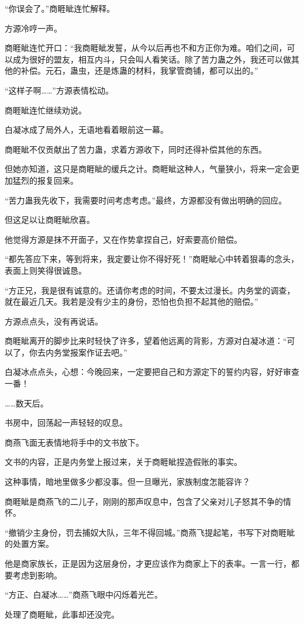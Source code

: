 \begin{this_body}
“你误会了。”商睚眦连忙解释。

方源冷哼一声。

商睚眦连忙开口：“我商睚眦发誓，从今以后再也不和方正你为难。咱们之间，可以成为很好的盟友，相互内斗，只会叫人看笑话。除了苦力蛊之外，我还可以做其他的补偿。元石，蛊虫，还是炼蛊的材料，我掌管商铺，都可以出的。”

“这样子啊……”方源表情松动。

商睚眦连忙继续劝说。

白凝冰成了局外人，无语地看着眼前这一幕。

商睚眦不仅贡献出了苦力蛊，求着方源收下，同时还得补偿其他的东西。

但她亦知道，这只是商睚眦的缓兵之计。商睚眦这种人，气量狭小，将来一定会更加猛烈的报复回来。

“苦力蛊我先收下，我需要时间考虑考虑。”最终，方源都没有做出明确的回应。

但这足以让商睚眦欣喜。

他觉得方源是抹不开面子，又在作势拿捏自己，好索要高价赔偿。

“都先答应下来，等到将来，我定要让你不得好死！”商睚眦心中转着狠毒的念头，表面上则笑得很诚恳。

“方正兄，我是很有诚意的。还请你考虑的时间，不要太过漫长。内务堂的调查，就在最近几天。我若是没有少主的身份，恐怕也负担不起其他的赔偿。”

方源点点头，没有再说话。

商睚眦离开的脚步比来时轻快了许多，望着他远离的背影，方源对白凝冰道：“可以了，你去内务堂报案作证去吧。”

白凝冰点点头，心想：今晚回来，一定要把自己和方源定下的誓约内容，好好审查一番！

……数天后。

书房中，回荡起一声轻轻的叹息。

商燕飞面无表情地将手中的文书放下。

文书的内容，正是内务堂上报过来，关于商睚眦捏造假账的事实。

这种事情，暗地里做多少都没事。但一旦曝光，家族制度怎能容许？

商睚眦是商燕飞的二儿子，刚刚的那声叹息中，包含了父亲对儿子怒其不争的情怀。

“撤销少主身份，罚去捕奴大队，三年不得回城。”商燕飞提起笔，书写下对商睚眦的处置方案。

他是商家族长，正是因为这层身份，才更应该作为商家上下的表率。一言一行，都要考虑到影响。

“方正、白凝冰……”商燕飞眼中闪烁着光芒。

处理了商睚眦，此事却还没完。


\end{this_body}
